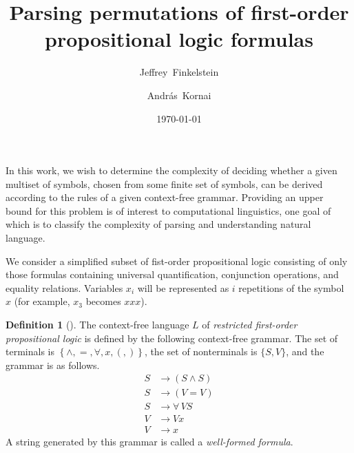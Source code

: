 \documentclass{article}
\author{Jeffrey~Finkelstein \and Andr\'as~Kornai}
\title{Parsing permutations of first-order propositional logic formulas}
\date{\today}
\theoremstyle{definition}
\newtheorem{definition}{Definition}
\newcommand{\yields}{\rightarrow}
\begin{document}
\maketitle

In this work, we wish to determine the complexity of deciding whether a given multiset of symbols, chosen from some finite set of symbols, can be derived according to the rules of a given context-free grammar.
Providing an upper bound for this problem is of interest to computational linguistics, one goal of which is to classify the complexity of parsing and understanding natural language.

We consider a simplified subset of fist-order propositional logic consisting of only those formulas containing universal quantification, conjunction operations, and equality relations.
Variables $x_i$ will be represented as $i$ repetitions of the symbol $x$ (for example, $x_3$ becomes $xxx$).
\begin{definition}[\cite{mp84}]
  The context-free language $L$ of \emph{restricted first-order propositional logic} is defined by the following context-free grammar.
  The set of terminals is $\left\{\land, =, \forall, x, (, ) \right\}$, the set of nonterminals is $\{S, V\}$, and the grammar is as follows.
  \begin{align*}
    S &\yields (S \land S) \\
    S &\yields (V = V) \\
    S &\yields \forall \, V S \\
    V &\yields Vx \\
    V &\yields x
  \end{align*}
  A string generated by this grammar is called a \emph{well-formed formula}.
\end{definition}


\end{document}
